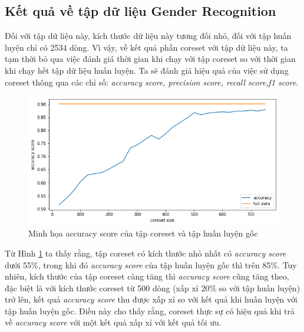 \documentclass[a4paper, 12pt, oneside]{report}
\begin{document}
\subsection{Kết quả về tập dữ liệu Gender Recognition}
Đối với tập dữ liệu này, kích thước dữ liệu này tương đối nhỏ, đối với tập huấn luyện chỉ có 2534 dòng. Vì vậy, về kết quả phần coreset với tập dữ liệu này, ta tạm thời bỏ qua việc đánh giá thời gian khi chạy với tập coreset so với thời gian khi chạy hết tập dữ liệu huấn luyện. Ta sẽ đánh giá hiệu quả của việc sử dụng coreset thông qua các chỉ số: \textit{accuracy score, precision score, recall score,f1 score}.
\begin{center}
    \begin{figure}[H]
    \begin{center}
     \includegraphics[scale=0.5]{accuracy_voice_gender.png}
    \end{center}
    \caption{ Minh họa accuracy score của tập coreset và tập huấn luyện gốc}
    \label{Hình 4.2}
    \end{figure}
\end{center}
Từ Hình \ref{Hình 4.2} ta thấy rằng, tập coreset có kích thước nhỏ nhất có \textit{accuracy score} dưới 55\%, trong khi đó \textit{accuracy score} của tập huấn luyện gốc thì trên 85\%. Tuy nhiên, kích thước của tập coreset càng tăng thì \textit{accuracy score} cũng tăng theo, đặc biệt là với kích thước coreset từ 500 dòng (xấp xỉ 20\% so với tập huấn luyện) trở lên, kết quả \textit{accuracy score} thu được xấp xỉ so với kết quả khi huấn luyện với tập huấn luyện gốc. Điều này cho thấy rằng, coreset thực sự có hiệu quả khi trả về \textit{accuracy score} với một kết quả xấp xỉ với kết quả tối ưu. 
\end{document}
